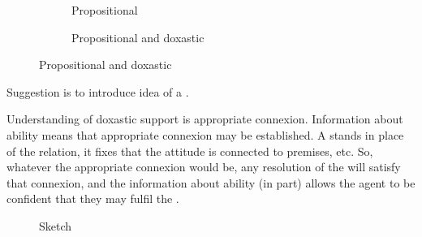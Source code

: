 \begin{note}[Illustration]
  \begin{figure}
    \begin{subfigure}[h]{.5\linewidth}
      \centering
    \caption{Propositional}
    \end{subfigure}
    \begin{subfigure}[h]{.5\linewidth}
      \centering
    \caption{Propositional and doxastic}
    \end{subfigure}
  \end{figure}
\end{note}

\begin{note}[Future]
  Suggestion is to introduce idea of a \future{}.

  Understanding of doxastic support is appropriate connexion.
  Information about ability means that appropriate connexion may be established.
  A \future{} stands in place of the relation, it fixes that the attitude is connected to premises, etc.
  So, whatever the appropriate connexion would be, any resolution of the \future{} will satisfy that connexion, and the information about ability (in part) allows the agent to be confident that they may fulfil the \future{}.
\end{note}

\begin{note}
    \begin{figure}
    \centering
    \caption{Sketch}
  \end{figure}
\end{note}

